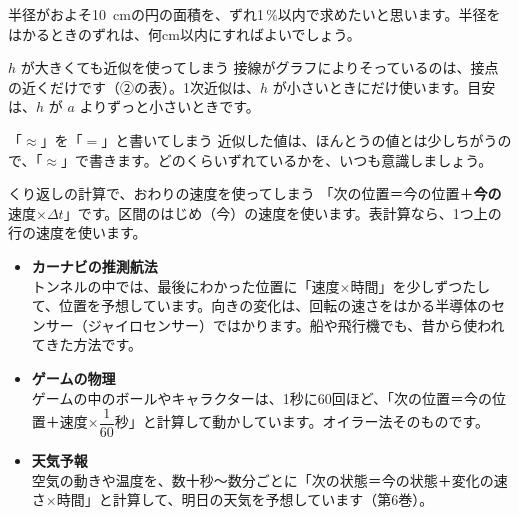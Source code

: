 \begin{jibun}
半径がおよそ\qty{10}{cm}の円の面積を、ずれ1\,\%以内で求めたいと思います。半径をはかるときのずれは、何cm以内にすればよいでしょう。
\end{jibun}


\begin{tsumazuki}{$h$ が大きくても近似を使ってしまう}
接線がグラフによりそっているのは、接点の近くだけです（②の表）。1次近似は、$h$ が小さいときにだけ使います。目安は、$h$ が $a$ よりずっと小さいときです。
\end{tsumazuki}

\begin{tsumazuki}{「$\approx$」を「$=$」と書いてしまう}
近似した値は、ほんとうの値とは少しちがうので、「$\approx$」で書きます。どのくらいずれているかを、いつも意識しましょう。
\end{tsumazuki}

\begin{tsumazuki}{くり返しの計算で、おわりの速度を使ってしまう}
「次の位置＝今の位置＋\textbf{今の}速度×$\Delta t$」です。区間のはじめ（今）の速度を使います。表計算なら、1つ上の行の速度を使います。
\end{tsumazuki}

\begin{butsuri}
\begin{itemize}[leftmargin=1.2\zw, itemsep=2pt, topsep=0pt, label={\color{bkPurple}●}]
\item \textbf{カーナビの推測航法}\\
トンネルの中では、最後にわかった位置に「速度×時間」を少しずつたして、位置を予想しています。向きの変化は、回転の速さをはかる半導体のセンサー（ジャイロセンサー）ではかります。船や飛行機でも、昔から使われてきた方法です。
\item \textbf{ゲームの物理}\\
ゲームの中のボールやキャラクターは、1秒に60回ほど、「次の位置＝今の位置＋速度×$\dfrac{1}{60}$秒」と計算して動かしています。オイラー法そのものです。
\item \textbf{天気予報}\\
空気の動きや温度を、数十秒〜数分ごとに「次の状態＝今の状態＋変化の速さ×時間」と計算して、明日の天気を予想しています（第6巻）。
\end{itemize}
\end{butsuri}

